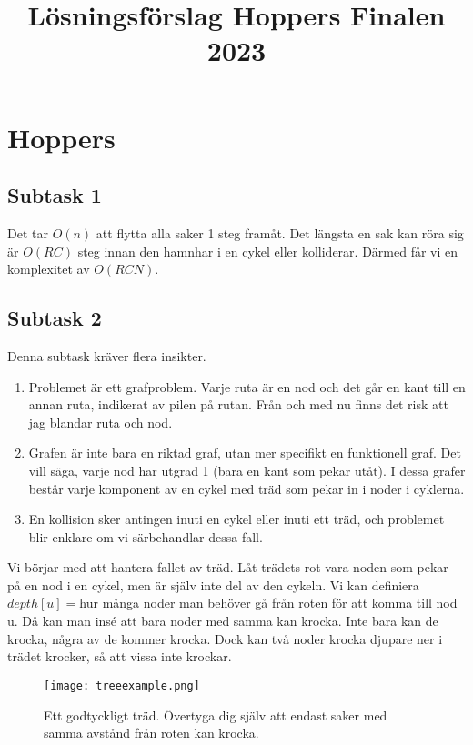 \documentclass{article}
\title{Lösningsförslag Hoppers Finalen 2023}
\date{}
\begin{document}
\maketitle

\section*{Hoppers}
\subsection*{Subtask 1}
Det tar $O(n)$ att flytta alla saker 1 steg framåt. Det längsta en sak kan röra sig är $O(RC)$ steg innan den hamnhar i en cykel eller kolliderar. Därmed får vi en komplexitet av $O(RCN)$.

\subsection*{Subtask 2}
Denna subtask kräver flera insikter.
\begin{enumerate}
\item Problemet är ett grafproblem. Varje ruta är en nod och det går en kant till en annan ruta, indikerat av pilen på rutan. Från och med nu finns det risk att jag blandar ruta och nod.
\item Grafen är inte bara en riktad graf, utan mer specifikt en funktionell graf. Det vill säga, varje nod har utgrad 1 (bara en kant som pekar utåt). I dessa grafer består varje komponent av en cykel med träd som pekar in i noder i cyklerna. 
\item En kollision sker antingen inuti en cykel eller inuti ett träd, och problemet blir enklare om vi särbehandlar dessa fall. 
\end{enumerate}

Vi börjar med att hantera fallet av träd. Låt trädets rot vara noden som pekar på en nod i en cykel, men är själv inte del av den cykeln. Vi kan definiera $depth[u]=$hur många noder man behöver gå från roten för att komma till nod u. Då kan man insé att bara noder med samma kan krocka. Inte bara kan de krocka, några av de kommer krocka. Dock kan två noder krocka djupare ner i trädet krocker, så att vissa inte krockar.
\begin{figure}[H]
  \centering
\texttt{[image: treeexample.png]}
  \caption{Ett godtyckligt träd. Övertyga dig själv att endast saker med samma avstånd från roten kan krocka.}
  \label{fig:hoppers_t0}
\end{figure}
\end{document}
